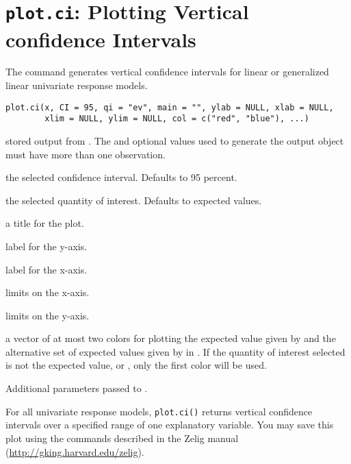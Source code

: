  \section{{\tt plot.ci}: Plotting Vertical confidence Intervals}\label{ss:plot.ci}
\begin{Description}\relax
The  command generates vertical
confidence intervals for linear or generalized linear univariate
response models.
\end{Description}
\begin{Usage}
\begin{verbatim}
plot.ci(x, CI = 95, qi = "ev", main = "", ylab = NULL, xlab = NULL,
        xlim = NULL, ylim = NULL, col = c("red", "blue"), ...) 
\end{verbatim}
\end{Usage}
\begin{Arguments}
\begin{ldescription}
\item[\code{x}] stored output from .  The  and optional
 values used to generate the  output object must
have more than one observation.
\item[\code{CI}] the selected confidence interval.  Defaults to 95
percent.
\item[\code{qi}] the selected quantity of interest.  Defaults to
expected values.
\item[\code{main}] a title for the plot.
\item[\code{ylab}] label for the y-axis.
\item[\code{xlab}] label for the x-axis.
\item[\code{xlim}] limits on the x-axis.
\item[\code{ylim}] limits on the y-axis.
\item[\code{col}] a vector of at most two colors for plotting the
expected value given by  and the alternative set of expected
values given by  in .  If the quantity of
interest selected is not the expected value, or ,
only the first color will be used.
\item[\code{...}] Additional parameters passed to .
\end{ldescription}
\end{Arguments}
\begin{Value}
For all univariate response models, {\tt plot.ci()} returns vertical
confidence intervals over a specified range of one explanatory
variable.  You may save this plot using the commands described in the
Zelig manual (\url{http://gking.harvard.edu/zelig}).
\end{Value}
